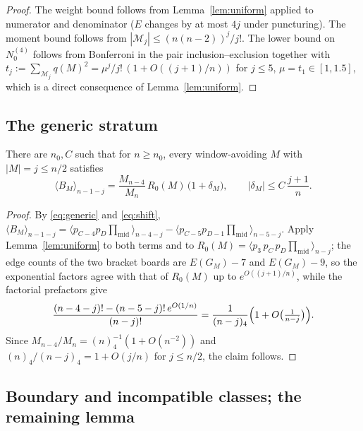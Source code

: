 \begin{proof}
The weight bound follows from Lemma~\ref{lem:uniform} applied to numerator
and denominator ($E$ changes by at most $4j$ under puncturing).  The
moment bound follows from $|\mathcal M_j|\le (n(n-2))^j/j!$.  The lower
bound on $N^{(4)}_0$ follows from Bonferroni in the pair
inclusion--exclusion together with
$t_j:=\sum_{\mathcal M_j}q(M)^2=\mu^j/j!\,(1+O((j{+}1)/n))$ for
$j\le5$, $\mu=t_1\in[1,1.5]$, which is a direct consequence of
Lemma~\ref{lem:uniform}.
\end{proof}

\subsection{The generic stratum}

\begin{proposition}\label{prop:generic}
There are $n_0,C$ such that for $n\ge n_0$, every window-avoiding $M$
with $|M|=j\le n/2$ satisfies
\[
\langle B_M\rangle_{n-1-j}
=\frac{M_{n-4}}{M_n}\,R_0(M)\,\bigl(1+\delta_M\bigr),
\qquad|\delta_M|\le C\,\frac{j+1}{n}.
\]
\end{proposition}

\begin{proof}
By \eqref{eq:generic} and \eqref{eq:shift},
$\langle B_M\rangle_{n-1-j}
=\langle p_{C-4}p_D\prod_{\mathrm{mid}}\rangle_{n-4-j}
-\langle p_{C-5}p_{D-1}\prod_{\mathrm{mid}}\rangle_{n-5-j}$.
Apply Lemma~\ref{lem:uniform} to both terms and to
$R_0(M)=\langle p_3\,p_C\,p_D\prod_{\mathrm{mid}}\rangle_{n-j}$; the
edge counts of the two bracket boards are $E(G_M)-7$ and $E(G_M)-9$, so
the exponential factors agree with that of $R_0(M)$ up to
$e^{O((j+1)/n)}$, while the factorial prefactors give
\[
\frac{(n-4-j)!-(n-5-j)!\,e^{O(1/n)}}{(n-j)!}
=\frac{1}{(n-j)_4}\Bigl(1+O\bigl(\tfrac1{n-j}\bigr)\Bigr).
\]  Since $M_{n-4}/M_n=(n)_4^{-1}(1+O(n^{-2}))$ and
$(n)_4/(n-j)_4=1+O(j/n)$ for $j\le n/2$, the claim follows.
\end{proof}

\subsection{Boundary and incompatible classes; the remaining lemma}
\label{sec:boundary}


